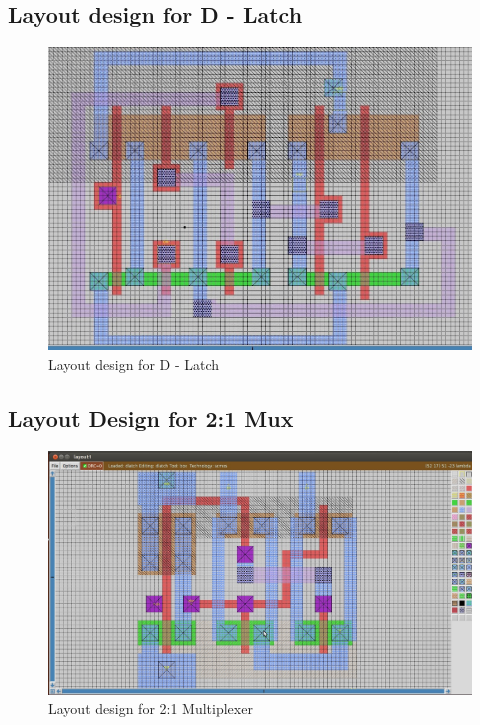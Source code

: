 \documentclass[12pt,a4paper]{article}
\begin{document}
\begin{center}
\clearpage

\subsection{Layout design for D - Latch}
\begin{figure}[h]
\centering
\includegraphics[scale=.5]{dlatch.jpg}
\caption[Short]{Layout design for D - Latch }
\end{figure}

\clearpage
\subsection{Layout Design for 2:1 Mux}
\begin{figure}[h]
\centering
\includegraphics[scale=.42]{2_1mux_layout1.jpg}
\caption[Short]{Layout design for 2:1 Multiplexer}
\end{figure}


\end{center}
\end{document}

